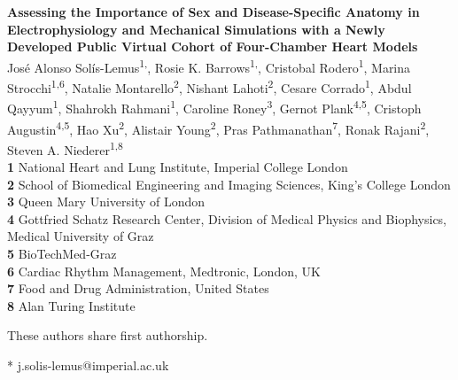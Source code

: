 \documentclass[10pt,letterpaper]{article}
\newcommand{\autor}{ Jos\'e Alonso Sol\'is-Lemus\textsuperscript{1,\Yinyang}, 
        Rosie K. Barrows\textsuperscript{1,\Yinyang},  
        Cristobal Rodero\textsuperscript{1}, 
        Marina Strocchi\textsuperscript{1,6}, 
        Natalie Montarello\textsuperscript{2}, Nishant Lahoti\textsuperscript{2}, 
        Cesare Corrado\textsuperscript{1}, 
        Abdul Qayyum\textsuperscript{1}, 
        Shahrokh Rahmani\textsuperscript{1},  
        Caroline Roney\textsuperscript{3}, 
        Gernot Plank\textsuperscript{4,5},
        Cristoph Augustin\textsuperscript{4,5}, 
        Hao Xu\textsuperscript{2}, 
        Alistair Young\textsuperscript{2}, 
        Pras Pathmanathan\textsuperscript{7}, 
        Ronak Rajani\textsuperscript{2},
        Steven A. Niederer\textsuperscript{1,8}
}
\newcommand{\titulo}{
Assessing the Importance of Sex and Disease-Specific Anatomy in 
    Electrophysiology and Mechanical Simulations with a Newly Developed 
    Public Virtual Cohort of Four-Chamber Heart Models
    }
\begin{document}
\vspace*{0.2in}

\begin{flushleft}
{\Large
\textbf{\titulo} %
}
\newline
\\
\autor\ 
\\
\bigskip
\textbf{1} National Heart and Lung Institute, Imperial College London 
\\
\textbf{2} School of Biomedical Engineering and Imaging Sciences, King's College London
\\
\textbf{3} Queen Mary University of London
\\
\textbf{4} Gottfried Schatz Research Center, Division of Medical Physics and Biophysics, Medical University of Graz
\\ 
\textbf{5} BioTechMed-Graz 
\\
\textbf{6} Cardiac Rhythm Management, Medtronic, London, UK
\\
\textbf{7} Food and Drug Administration, United States
\\
\textbf{8} Alan Turing Institute
\\ 
\bigskip

% 
%
\Yinyang These authors share first authorship.





* j.solis-lemus@imperial.ac.uk

\end{flushleft}
\end{document}

